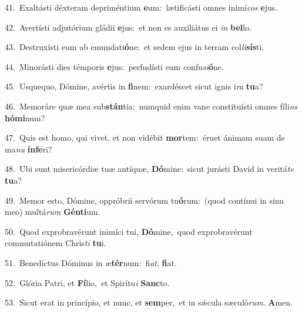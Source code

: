 {\numbfont\textcolor{\numbcolor}{41.}}~Exaltásti déxteram depriméntium \textbf{e}\-um:~\star lætificásti omnes inimí\textit{cos} \textbf{e}\-jus.\par
{\numbfont\textcolor{\numbcolor}{42.}}~Avertísti adjutórium gládii \textbf{e}\-jus:~\star et non es auxiliátus ei \textit{in} \textbf{bel}\-lo.\par
{\numbfont\textcolor{\numbcolor}{43.}}~Destruxísti eum ab emundati\-\textbf{ó}\-ne:~\star et sedem ejus in terram col\-\textit{li}\-\textbf{sís}ti.\par
{\numbfont\textcolor{\numbcolor}{44.}}~Minorásti dies témporis \textbf{e}\-jus:~\star perfudísti eum confu\-\textit{si}\-\textbf{ó}ne.\par
{\numbfont\textcolor{\numbcolor}{45.}}~Usquequo, Dómine, avértis in \textbf{fi}\-nem:~\star exardéscet sicut ignis i\textit{ra} \textbf{tu}\-a?\par
{\numbfont\textcolor{\numbcolor}{46.}}~Memoráre quæ mea sub\-\textbf{stán}\-tia:~\star numquid enim vane constituísti omnes fíli\textit{os} \textbf{hó}\-\textbf{mi}num?\par
{\numbfont\textcolor{\numbcolor}{47.}}~Quis est homo, qui vivet, et non vidébit \textbf{mor}\-tem:~\star éruet ánimam suam de ma\textit{nu} \textbf{ín}\-\textbf{fe}ri?\par
{\numbfont\textcolor{\numbcolor}{48.}}~Ubi sunt misericórdiæ tuæ antíquæ, \textbf{Dó}\-mine:~\star sicut jurásti David in veritá\textit{te} \textbf{tu}\-a?\par
{\numbfont\textcolor{\numbcolor}{49.}}~Memor esto, Dómine, oppróbrii servórum tu\-\textbf{ó}\-rum:~\star (quod contínui in sinu meo) multá\textit{rum} \textbf{Gén}\-\textbf{ti}um.\par
{\numbfont\textcolor{\numbcolor}{50.}}~Quod exprobravérunt inimíci tui, \textbf{Dó}\-mine,~\star quod exprobravérunt commutatiónem Chris\textit{ti} \textbf{tu}\-i.\par
{\numbfont\textcolor{\numbcolor}{51.}}~Benedíctus Dóminus in æ\-\textbf{tér}\-num:~\star fi\-\textit{at}\-, \textbf{fi}\-at.\par
{\numbfont\textcolor{\numbcolor}{52.}}~Glória Patri, et \textbf{Fí}\-lio,~\star et Spirítu\textit{i} \textbf{Sanc}\-to.\par
{\numbfont\textcolor{\numbcolor}{53.}}~Sicut erat in princípio, et nunc, et \textbf{sem}\-per,~\star et in sǽcula sæculó\-\textit{rum}\-. \textbf{A}\-men.\par
